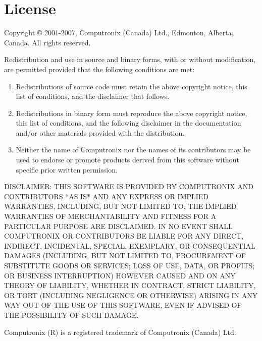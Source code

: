 \chapter{License}

\centerline{}

Copyright \copyright{} 2001-2007, Computronix (Canada) Ltd., Edmonton, Alberta, Canada.
All rights reserved.

Redistribution and use in source and binary forms, with or without
modification, are permitted provided that the following conditions are met:

\begin{enumerate}
\item
    Redistributions of source code must retain the above copyright notice,
    this list of conditions, and the disclaimer that follows.

\item
    Redistributions in binary form must reproduce the above copyright
    notice, this list of conditions, and the following disclaimer in the
    documentation and/or other materials provided with the distribution.

\item
    Neither the name of Computronix nor the names of its contributors may
    be used to endorse or promote products derived from this software
    without specific prior written permission.
\end{enumerate}

DISCLAIMER:
THIS SOFTWARE IS PROVIDED BY COMPUTRONIX AND CONTRIBUTORS *AS IS*
AND ANY EXPRESS OR IMPLIED WARRANTIES, INCLUDING, BUT NOT LIMITED TO,
THE IMPLIED WARRANTIES OF MERCHANTABILITY AND FITNESS FOR A
PARTICULAR PURPOSE ARE DISCLAIMED. IN NO EVENT SHALL COMPUTRONIX
OR CONTRIBUTORS BE LIABLE FOR ANY DIRECT, INDIRECT, INCIDENTAL,
SPECIAL, EXEMPLARY, OR CONSEQUENTIAL DAMAGES (INCLUDING, BUT NOT
LIMITED TO, PROCUREMENT OF SUBSTITUTE GOODS OR SERVICES; LOSS OF
USE, DATA, OR PROFITS; OR BUSINESS INTERRUPTION) HOWEVER CAUSED
AND ON ANY THEORY OF LIABILITY, WHETHER IN CONTRACT, STRICT LIABILITY,
OR TORT (INCLUDING NEGLIGENCE OR OTHERWISE) ARISING IN ANY WAY OUT
OF THE USE OF THIS SOFTWARE, EVEN IF ADVISED OF THE POSSIBILITY OF
SUCH DAMAGE.

Computronix (R) is a registered trademark of Computronix (Canada) Ltd.

